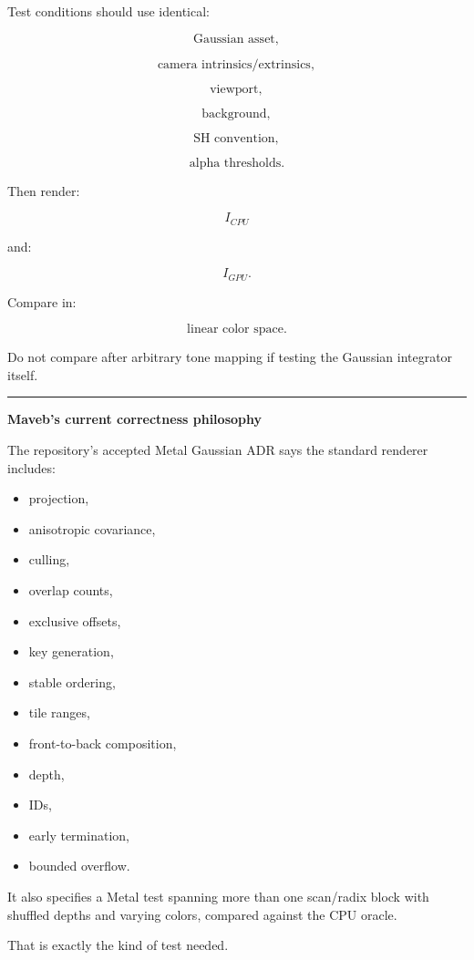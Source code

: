 Test conditions should use identical:

\[
\text{Gaussian asset},
\]

\[
\text{camera intrinsics/extrinsics},
\]

\[
\text{viewport},
\]

\[
\text{background},
\]

\[
\text{SH convention},
\]

\[
\text{alpha thresholds}.
\]

Then render:

\[
I_{CPU}
\]

and:

\[
I_{GPU}.
\]

Compare in:

\[
\boxed{\text{linear color space}.}
\]

Do not compare after arbitrary tone mapping if testing the Gaussian integrator itself.

\begin{center}\rule{0.5\linewidth}{0.5pt}\end{center}

\textbf{Maveb's current correctness philosophy}

The repository's accepted Metal Gaussian ADR says the standard renderer includes:

\begin{itemize}
\tightlist
\item
  projection,
\item
  anisotropic covariance,
\item
  culling,
\item
  overlap counts,
\item
  exclusive offsets,
\item
  key generation,
\item
  stable ordering,
\item
  tile ranges,
\item
  front-to-back composition,
\item
  depth,
\item
  IDs,
\item
  early termination,
\item
  bounded overflow.
\end{itemize}

It also specifies a Metal test spanning more than one scan/radix block with shuffled depths and varying colors, compared against the CPU oracle.

That is exactly the kind of test needed.

